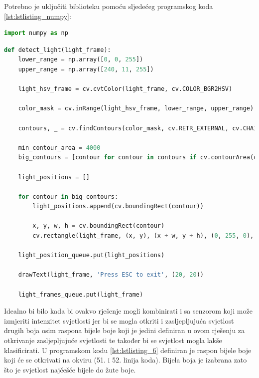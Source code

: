 \documentclass{foi}
\begin{document}
\flushleft Potrebno je uključiti biblioteku pomoću sljedećeg programskog koda \ref{lst:lstlisting_numpy}:
\begin{lstlisting}[language=Python, label={lst:lstlisting_numpy}, firstnumber=3, style=colored, caption=Uključivanje biblioteke $numpy$]
import numpy as np
\end{lstlisting}

\begin{lstlisting}[language=Python, label={lst:lstlisting_6}, firstnumber=50, style=colored, caption={Definicija funkcije $detect\_light()$}]
def detect_light(light_frame):
    lower_range = np.array([0, 0, 255])
    upper_range = np.array([240, 11, 255])

    light_hsv_frame = cv.cvtColor(light_frame, cv.COLOR_BGR2HSV)

    color_mask = cv.inRange(light_hsv_frame, lower_range, upper_range)

    contours, _ = cv.findContours(color_mask, cv.RETR_EXTERNAL, cv.CHAIN_APPROX_SIMPLE)

    min_contour_area = 4000
    big_contours = [contour for contour in contours if cv.contourArea(contour) > min_contour_area]

    light_positions = []

    for contour in big_contours:
        light_positions.append(cv.boundingRect(contour))

        x, y, w, h = cv.boundingRect(contour)
        cv.rectangle(light_frame, (x, y), (x + w, y + h), (0, 255, 0), 2)

    light_position_queue.put(light_positions)

    drawText(light_frame, 'Press ESC to exit', (20, 20))

    light_frames_queue.put(light_frame)
\end{lstlisting}

\justifying

\newpage
Idealno bi bilo kada bi ovakvo rješenje mogli kombinirati i sa senzorom koji može izmjeriti intenzitet svjetlosti jer bi se mogla otkriti i zasljepljujuća svjetlost drugih boja osim raspona bijele boje koji je jedini definiran u ovom rješenju za otkrivanje zasljepljujuće svjetlosti te također bi se svjetlost mogla lakše klasificirati. U programskom kodu \ref{lst:lstlisting_6} definiran je raspon bijele boje koji će se otkrivati na okviru (51. i 52. linija koda). Bijela boja je izabrana zato što je svjetlost najčešće bijele do žute boje.
\end{document}
